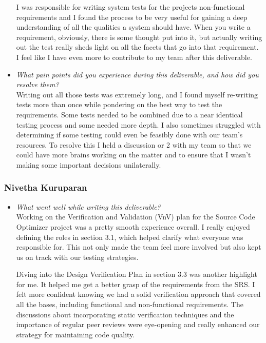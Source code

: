 \documentclass[12pt, titlepage]{article}
\begin{document}
\begin{appendices}
\begin{itemize}
  I was responsible for writing system tests for the projects non-functional requirements and I found the process to be very useful for gaining a deep understanding of all the qualities a system should have. When you write a requirement, obviously, there is some thought put into it, but actually writing out the test really sheds light on all the facets that go into that requirement. I feel like I have even more to contribute to my team after this deliverable.

  \item \textit{What pain points did you experience during this deliverable, and how did you resolve them?}\\
  
  Writing out all those tests was extremely long, and I found myself re-writing tests more than once while pondering on the best way to test the requirements. Some tests needed to be combined due to a near identical testing process and some needed more depth. I also sometimes struggled with determining if some testing could even be feasibly done with our team's resources. To resolve this I held a discussion or 2 with my team so that we could have more brains working on the matter and to ensure that I wasn't making some important decisions unilaterally.
\end{itemize}

\subsubsection*{Nivetha Kuruparan}
\begin{itemize}
  \item \textit{What went well while writing this deliverable?} \\
  
    Working on the Verification and Validation (VnV) plan for the Source Code Optimizer project was a pretty smooth experience overall. I really enjoyed defining the roles in section 3.1, which helped clarify what everyone was responsible for. This not only made the team feel more involved but also kept us on track with our testing strategies.
    
    Diving into the Design Verification Plan in section 3.3 was another highlight for me. It helped me get a better grasp of the requirements from the SRS. I felt more confident knowing we had a solid verification approach that covered all the bases, including functional and non-functional requirements. The discussions about incorporating static verification techniques and the importance of regular peer reviews were eye-opening and really enhanced our strategy for maintaining code quality.


\end{itemize}
\end{appendices}
\end{document}
